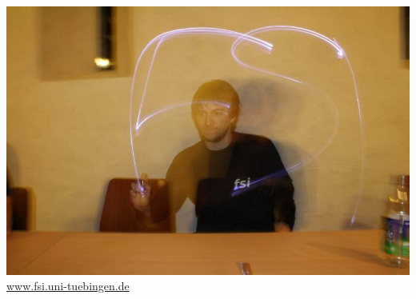 \documentclass{beamer}
\begin{document}
	\begin{frame}
		\includegraphics[width=\linewidth]{fsi-manu.png}
		\vspace*{2mm}\\
		{\centering\url{www.fsi.uni-tuebingen.de}}
	\end{frame}
		
	
\end{document}

